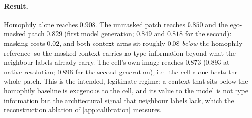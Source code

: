 \paragraph{Result.} Homophily alone reaches $0.908$. The unmasked patch reaches $0.850$ and the ego-masked patch $0.829$ (first model generation; $0.849$ and $0.818$ for the second): masking costs $0.02$, and both context arms sit roughly $0.08$ \emph{below} the homophily reference, so the masked context carries no type information beyond what the neighbour labels already carry. The cell's own image reaches $0.873$ ($0.893$ at native resolution; $0.896$ for the second generation), i.e.\ the cell alone beats the whole patch. This is the intended, legitimate regime: a context that sits below the homophily baseline is exogenous to the cell, and its value to the model is not type information but the architectural signal that neighbour labels lack, which the reconstruction ablation of \cref{app:calibration} measures. 
